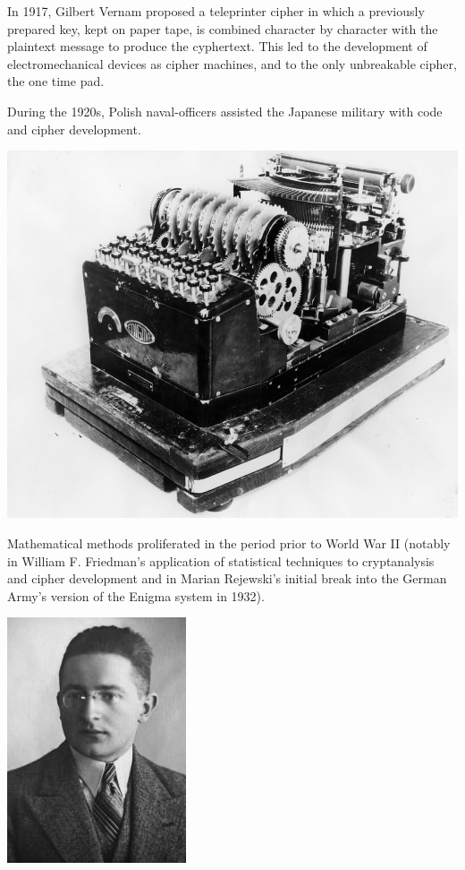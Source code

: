 \documentclass{report}
\begin{document}
{{{In 1917, Gilbert Vernam proposed a teleprinter cipher in which a previously prepared key, kept on paper tape, is combined character by character with the plaintext message to produce the cyphertext. This led to the development of electromechanical devices as cipher machines, and to the only unbreakable cipher, the one time pad.

During the 1920s, Polish naval-officers assisted the Japanese military with code and cipher development.
\begin{center}

\includegraphics[scale=0.3]{"enigma.png"}
\end{center}
Mathematical methods proliferated in the period prior to World War II (notably in William F. Friedman's application of statistical techniques to cryptanalysis and cipher development and in Marian Rejewski's initial break into the German Army's version of the Enigma system in 1932).}

\begin{center}
\includegraphics[scale=0.8]{"rajewski.png"}
\end{center}
}}
\end{document}
